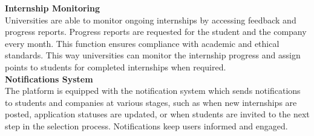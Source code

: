 \textbf{Internship Monitoring}\\
Universities are able to monitor ongoing internships by accessing feedback and progress reports. Progress reports are requested for the student and the company every month. This function ensures compliance with academic and ethical standards. This way universities can monitor the internship progress and assign points to students for completed internships when required. \\

\textbf{Notifications System} \\
The platform is equipped with the notification system which sends notifications to students and companies at various stages, such as when new internships are posted, application statuses are updated, or when students are invited to the next step in the selection process. Notifications keep users informed and engaged. \\

